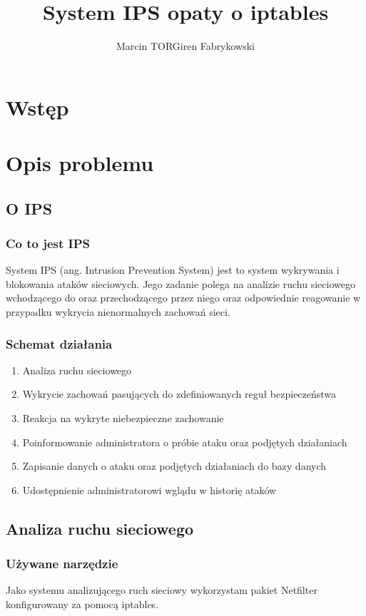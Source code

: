 \documentclass[a4paper,10pt]{book}
\title{System IPS opaty o iptables}
\author{Marcin TORGiren Fabrykowski}
\begin{document}
\maketitle
\newpage
\tableofcontents
\chapter*{Wstęp}
\chapter{Opis problemu}
	\section{O IPS}
		\subsection{Co to jest IPS}
		System IPS (ang. Intrusion Prevention System) jest to system wykrywania i blokowania ataków sieciowych.
		Jego zadanie polega na analizie ruchu sieciowego wchodzącego do oraz przechodzącego przez niego oraz odpowiednie reagowanie w przypadku wykrycia nienormalnych zachowań sieci.
		\subsection{Schemat działania}
			\begin{enumerate}
				\item Analiza ruchu sieciowego
				\item Wykrycie zachowań pasujących do zdefiniowanych reguł bezpieczeństwa
				\item Reakcja na wykryte niebezpieczne zachowanie
				\item Poinformowanie administratora o próbie ataku oraz podjętych działaniach
				\item Zapisanie danych o ataku oraz podjętych działaniach do bazy danych
				\item Udostępnienie administratorowi wglądu w historię ataków
			\end{enumerate}
	\section{Analiza ruchu sieciowego}
		\subsection{Używane narzędzie}
			Jako systemu analizującego ruch sieciowy wykorzystam pakiet Netfilter konfigurowany za pomocą iptables.
\end{document}
